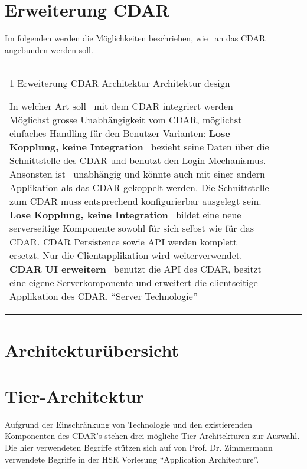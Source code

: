 	\newcommand{\decision}[2]{
		\vspace{0.5cm}
		\noindent
		\begin{tabularx}{\textwidth}{|p{0.2\textwidth}|X|l|l|}
			\hline
			#1
			\hline
			#2
			\hline
		\end{tabularx}
		\vspace{0.5cm}
		\newline	
	}

	\section{Erweiterung CDAR}
		Im folgenden werden die Möglichkeiten beschrieben, wie \eeppi\ an das CDAR angebunden werden soll.
		
		\decision{
			\decisionHeader
			{1}
			{Erweiterung CDAR}
			{Architektur}
			{Architektur design}
		}{
			\decisionContent
			{}
			{In welcher Art soll \eeppi\ mit dem CDAR integriert werden}
			{}
			{Möglichst grosse Unabhängigkeit vom CDAR, möglichst einfaches Handling für den Benutzer}{
				Varianten:\newline
				\textbf{Lose Kopplung, keine Integration}\newline
				\eeppi\ bezieht seine Daten über die Schnittstelle des CDAR und benutzt den Login-Mechanismus. 
			Ansonsten ist \eeppi\ unabhängig und könnte auch mit einer andern Applikation als das CDAR gekoppelt werden. 
			Die Schnittstelle zum CDAR muss entsprechend konfigurierbar ausgelegt sein. \newline
				\newline
				\textbf{Lose Kopplung, keine Integration}\newline
				\eeppi\ bildet eine neue serverseitige Komponente sowohl für sich selbst wie für das CDAR.
			CDAR Persistence sowie API werden komplett ersetzt.
			Nur die Clientapplikation wird weiterverwendet.\newline
				\newline
				\textbf{CDAR UI erweitern}\newline
				\eeppi\ benutzt die API des CDAR, besitzt eine eigene Serverkomponente und erweitert die clientseitige Applikation des CDAR.
			}
			{}
			{}
			{"`Server Technologie"'}
		}		
		

	\section{Architekturübersicht}
	
	
	\section{Tier-Architektur}
		Aufgrund der Einschränkung von Technologie und den existierenden Komponenten des CDAR's stehen drei mögliche Tier-Architekturen zur Auswahl.
		Die hier verwendeten Begriffe stützen sich auf von Prof. Dr. Zimmermann verwendete Begriffe in der HSR Vorlesung "`Application Architecture"'\cite{_layers_2014}.
	

